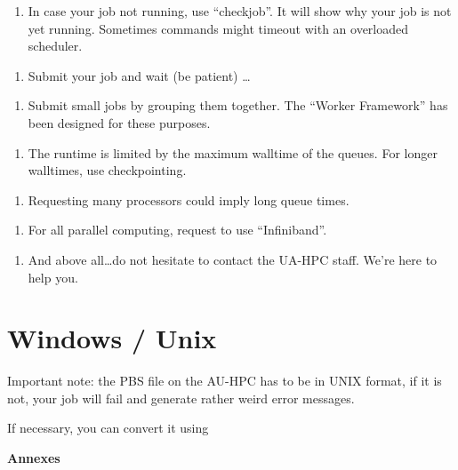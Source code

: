 \begin{enumerate}
\item  In case your job not running, use ``checkjob''.  It will show why your job is not yet running. Sometimes commands might timeout with an overloaded scheduler.
\end{enumerate}

\begin{enumerate}
\item  Submit your job and wait (be patient) \ldots
\end{enumerate}

\begin{enumerate}
\item  Submit small jobs by grouping them together. The ``Worker Framework'' has been designed for these purposes.
\end{enumerate}

\begin{enumerate}
\item  The runtime is limited by the maximum walltime of the queues. For longer walltimes, use checkpointing.
\end{enumerate}

\begin{enumerate}
\item  Requesting many processors could imply long queue times.
\end{enumerate}

\begin{enumerate}
\item  For all parallel computing, request to use ``Infiniband''.
\end{enumerate}

\begin{enumerate}
\item  And above all\dots  do not hesitate to contact the UA-HPC staff. We're here to help you.
\end{enumerate}

\section{Windows / Unix}

Important note: the PBS file on the AU-HPC has to be in UNIX format, if it is not, your job will fail and generate rather weird error messages.

If necessary, you can convert it using
\begin{prompt}
$ %
\end{prompt}

\textbf{Annexes}

